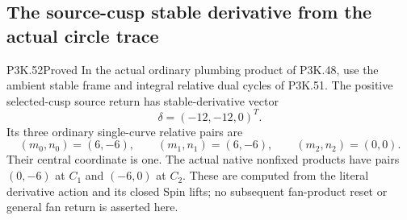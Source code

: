 \subsection{The source-cusp stable derivative from the actual circle trace}
\begin{statement}{P3K.52}{Proved}
In the actual ordinary plumbing product of P3K.48, use the ambient
stable frame and integral relative dual cycles of P3K.51. The
positive selected-cusp source return has stable-derivative vector
\[
 \delta=(-12,-12,0)^T.
\]
Its three ordinary single-curve relative pairs are
\[
 (m_0,n_0)=(6,-6),\qquad(m_1,n_1)=(6,-6),\qquad
 (m_2,n_2)=(0,0).
\]
Their central coordinate is one. The actual native nonfixed products
have pairs \((0,-6)\) at \(C_1\) and \((-6,0)\) at \(C_2\).
These are computed from the literal derivative action and its
closed Spin lifts; no subsequent fan-product reset or general fan
return is asserted here.
\end{statement}
